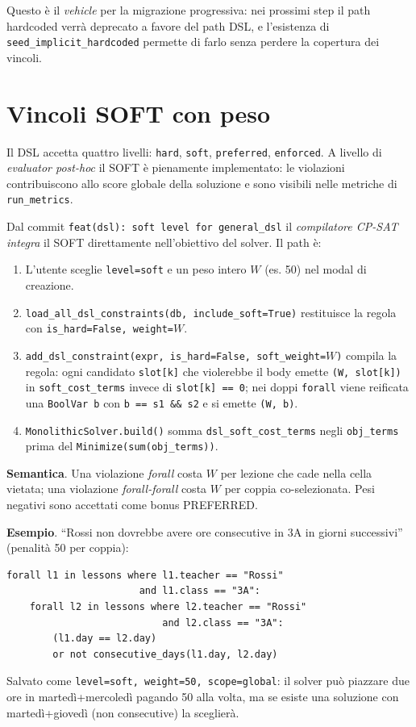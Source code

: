 Questo \`e il \emph{vehicle} per la migrazione progressiva: nei
prossimi step il path hardcoded verr\`a deprecato a favore del
path DSL, e l'esistenza di \texttt{seed\_implicit\_hardcoded}
permette di farlo senza perdere la copertura dei vincoli.

\section{Vincoli SOFT con peso}
\label{sec:dsl-soft-status}

Il DSL accetta quattro livelli: \texttt{hard}, \texttt{soft},
\texttt{preferred}, \texttt{enforced}. A livello di
\emph{evaluator post-hoc} il SOFT \`e pienamente implementato: le
violazioni contribuiscono allo score globale della soluzione e
sono visibili nelle metriche di \texttt{run\_metrics}.

Dal commit \texttt{feat(dsl): soft level for general\_dsl} il
\emph{compilatore CP-SAT} \emph{integra} il SOFT direttamente
nell'obiettivo del solver. Il path \`e:

\begin{enumerate}
\item L'utente sceglie \texttt{level=soft} e un peso intero
  $W$ (es. 50) nel modal di creazione.
\item \texttt{load\_all\_dsl\_constraints(db, include\_soft=True)}
  restituisce la regola con \texttt{is\_hard=False, weight=$W$}.
\item \texttt{add\_dsl\_constraint(expr, is\_hard=False,
  soft\_weight=$W$)} compila la regola: ogni candidato
  \texttt{slot[k]} che violerebbe il body emette
  \texttt{(W, slot[k])} in \texttt{soft\_cost\_terms} invece di
  \texttt{slot[k] == 0}; nei doppi \texttt{forall} viene reificata
  una \texttt{BoolVar b} con \texttt{b == s1 \&\& s2} e si emette
  \texttt{(W, b)}.
\item \texttt{MonolithicSolver.build()} somma
  \texttt{dsl\_soft\_cost\_terms} negli \texttt{obj\_terms} prima
  del \texttt{Minimize(sum(obj\_terms))}.
\end{enumerate}

\textbf{Semantica}. Una violazione \emph{forall} costa
$W$ per lezione che cade nella cella vietata; una violazione
\emph{forall-forall} costa $W$ per coppia co-selezionata. Pesi
negativi sono accettati come bonus PREFERRED.

\textbf{Esempio}. ``Rossi non dovrebbe avere ore consecutive in
3A in giorni successivi'' (penalit\`a 50 per coppia):
\begin{lstlisting}
forall l1 in lessons where l1.teacher == "Rossi"
                       and l1.class == "3A":
    forall l2 in lessons where l2.teacher == "Rossi"
                           and l2.class == "3A":
        (l1.day == l2.day)
        or not consecutive_days(l1.day, l2.day)
\end{lstlisting}
Salvato come \texttt{level=soft, weight=50, scope=global}: il
solver pu\`o piazzare due ore in marted\`i+mercoled\`i pagando
50 alla volta, ma se esiste una soluzione con marted\`i+gioved\`i
(non consecutive) la sceglier\`a.

